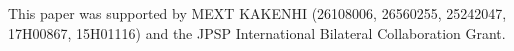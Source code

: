 \documentclass[a4paper]{spie}  %
\begin{document}
This paper was supported by MEXT KAKENHI (26108006, 26560255, 25242047, 17H00867, 15H01116) and the JPSP International Bilateral Collaboration Grant. 
\clearpage
\newpage


\end{document}
